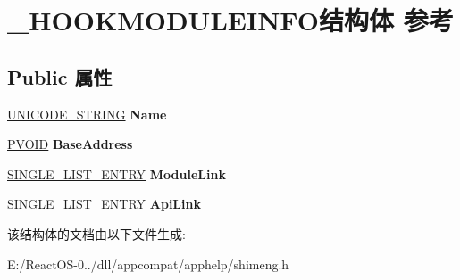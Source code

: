 \hypertarget{struct___h_o_o_k_m_o_d_u_l_e_i_n_f_o}{}\section{\+\_\+\+H\+O\+O\+K\+M\+O\+D\+U\+L\+E\+I\+N\+F\+O结构体 参考}
\label{struct___h_o_o_k_m_o_d_u_l_e_i_n_f_o}
\subsection*{Public 属性}
\begin{DoxyCompactItemize}
\item 
\mbox{\label{struct___h_o_o_k_m_o_d_u_l_e_i_n_f_o_a86970f043ac8ac89f70c9096b03db14e}} 
\hyperlink{struct___u_n_i_c_o_d_e___s_t_r_i_n_g}{U\+N\+I\+C\+O\+D\+E\+\_\+\+S\+T\+R\+I\+NG} {\bfseries Name}
\item 
\mbox{\label{struct___h_o_o_k_m_o_d_u_l_e_i_n_f_o_a038e109122881772bac00b4ca80fb28c}} 
\hyperlink{interfacevoid}{P\+V\+O\+ID} {\bfseries Base\+Address}
\item 
\mbox{\label{struct___h_o_o_k_m_o_d_u_l_e_i_n_f_o_a599599098e4b1c9bbf0e443ad67554f5}} 
\hyperlink{struct___s_i_n_g_l_e___l_i_s_t___e_n_t_r_y}{S\+I\+N\+G\+L\+E\+\_\+\+L\+I\+S\+T\+\_\+\+E\+N\+T\+RY} {\bfseries Module\+Link}
\item 
\mbox{\label{struct___h_o_o_k_m_o_d_u_l_e_i_n_f_o_a74b73f662d598b2e4f6edd4643f02a6f}} 
\hyperlink{struct___s_i_n_g_l_e___l_i_s_t___e_n_t_r_y}{S\+I\+N\+G\+L\+E\+\_\+\+L\+I\+S\+T\+\_\+\+E\+N\+T\+RY} {\bfseries Api\+Link}
\end{DoxyCompactItemize}


该结构体的文档由以下文件生成\+:\begin{DoxyCompactItemize}
\item 
E\+:/\+React\+O\+S-\/0../dll/appcompat/apphelp/shimeng.\+h\end{DoxyCompactItemize}
